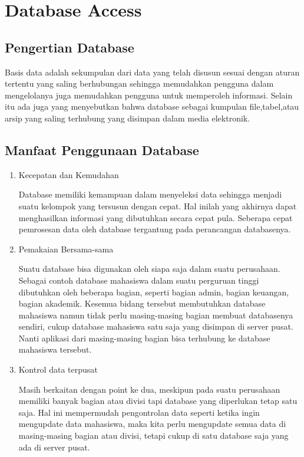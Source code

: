 
\section{Database Access}

\subsection{Pengertian Database} \par
	Basis data adalah sekumpulan dari data yang telah disusun sesuai dengan aturan tertentu yang saling berhubungan sehingga memudahkan pengguna dalam mengelolanya juga memudahkan pengguna untuk memperoleh informasi. Selain itu ada juga yang menyebutkan bahwa database sebagai kumpulan ﬁle,tabel,atau arsip yang saling terhubung yang disimpan dalam media elektronik. \par

\subsection {Manfaat Penggunaan Database}
	\begin{enumerate}
		\item Kecepatan dan Kemudahan \par
			  Database memiliki kemampuan dalam menyeleksi data sehingga menjadi suatu kelompok yang tersusun dengan cepat. Hal inilah yang akhirnya dapat menghasilkan informasi yang dibutuhkan secara cepat pula. Seberapa cepat pemrosesan data oleh database tergantung pada perancangan databasenya. \par
     
		\item Pemakaian Bersama-sama \par
			Suatu database bisa digunakan oleh siapa saja dalam suatu perusahaan. Sebagai contoh database mahasiswa dalam suatu perguruan tinggi dibutuhkan oleh beberapa bagian, seperti bagian admin, bagian keuangan, bagian akademik. Kesemua bidang tersebut membutuhkan database mahasiswa namun tidak perlu masing-masing bagian membuat databasenya sendiri, cukup database mahasiswa satu saja yang disimpan di server pusat. Nanti aplikasi dari masing-masing bagian bisa terhubung ke database mahasiswa tersebut. \par
			
		\item Kontrol data terpusat \par
Masih berkaitan dengan point ke dua, meskipun pada suatu perusahaan memiliki banyak bagian atau divisi tapi database yang diperlukan tetap satu saja. Hal ini mempermudah pengontrolan data seperti ketika ingin mengupdate data mahasiswa, maka kita perlu mengupdate semua data di masing-masing bagian atau divisi, tetapi cukup di satu database saja yang ada di server pusat. \par
	\end{enumerate}
	
